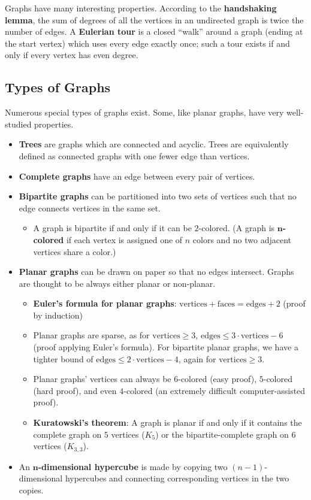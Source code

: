 \documentclass[12pt]{article}
\begin{document}
Graphs have many interesting properties. According to the \textbf{handshaking lemma}, the sum of degrees of all the vertices in an undirected graph is twice the number of edges. A \textbf{Eulerian tour} is a closed ``walk'' around a graph (ending at the start vertex) which uses every edge exactly once; such a tour exists if and only if every vertex has even degree.

\subsection{Types of Graphs}

Numerous special types of graphs exist. Some, like planar graphs, have very well-studied properties.
\begin{itemize}
\item \textbf{Trees} are graphs which are connected and acyclic. Trees are equivalently defined as connected graphs with one fewer edge than vertices.
\item \textbf{Complete graphs} have an edge between every pair of vertices.
\item \textbf{Bipartite graphs} can be partitioned into two sets of vertices such that no edge connects vertices in the same set.
\begin{itemize}
\item A graph is bipartite if and only if it can be $2$-colored. (A graph is \textbf{$\mathbf{n}$-colored}  if each vertex is assigned one of $n$ colors and no two adjacent vertices share a color.)
\end{itemize}
\item \textbf{Planar graphs} can be drawn on paper so that no edges intersect. Graphs are thought to be always either planar or non-planar.
\begin{itemize}
\item \textbf{Euler's formula for planar graphs}: $\mathrm{vertices} + \mathrm{faces} = \mathrm{edges} + 2$ (proof by induction)
\item Planar graphs are sparse, as for $\mathrm{vertices} \geq 3$, $\mathrm{edges} \leq 3 \cdot \mathrm{vertices} - 6$ (proof applying Euler's formula). For bipartite planar graphs, we have a tighter bound of $\mathrm{edges} \leq 2 \cdot \mathrm{vertices} - 4$, again for $\mathrm{vertices} \geq 3$.
\item Planar graphs' vertices can always be $6$-colored (easy proof), $5$-colored (hard proof), and even $4$-colored (an extremely difficult computer-assisted proof).
\item \textbf{Kuratowski's theorem}: A graph is planar if and only if it contains the complete graph on $5$ vertices ($K_5$) or the bipartite-complete graph on $6$ vertices ($K_{3, 3}$).
\end{itemize}
\item An \textbf{$\mathbf{n}$-dimensional hypercube} is made by copying two $(n - 1)$-dimensional hypercubes and connecting corresponding vertices in the two copies.
\end{itemize}
\end{document}
